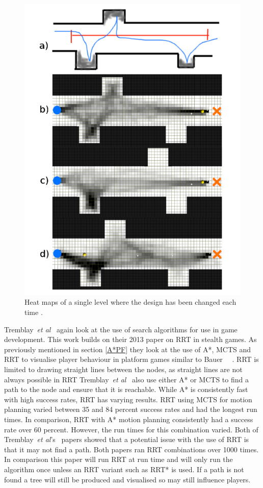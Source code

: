 \documentclass[journal]{IEEEtran}
\begin{document}
\begin{figure}[h]
	\includegraphics[width=1.0\linewidth]{TremblayHeatMap.png}
	\caption{Heat maps of a single level where the design has been changed each time \cite{Tremblay2013}.}
	\label{TremblayHeatMap}
\end{figure} 

Tremblay~\textit{et al}~\cite{Tremblay2014} again look at the use of search algorithms for use in game development. This work builds on their 2013 paper on RRT in stealth games. As previously mentioned in section \ref{A*PF} they look at the use of A*, MCTS and RRT to visualise player behaviour in platform games similar to Bauer ~\cite{Tremblay2014}~\cite{bauer2012}.  RRT is limited to drawing straight lines between the nodes, as straight lines are not always possible in RRT Tremblay~\textit{et al}~\cite{Tremblay2014} also use either A* or MCTS to find a path to the node and ensure that it is reachable.
While A* is consistently fast with high success rates, RRT has varying results. RRT using MCTS for motion planning varied between 35 and 84 percent success rates and had the longest run times. In comparison, RRT with A* motion planning consistently had a success rate over 60 percent. However, the run times for this combination varied. 
Both of Tremblay~\textit{et al}'s~\cite{Tremblay2014,Tremblay2013} papers showed that a potential issue with the use of RRT is that it may not find a path. Both papers ran RRT combinations over 1000 times. In comparison this paper will run RRT at run time and will only run the algorithm once unless an RRT variant such as RRT* is used. If a path is not found a tree will still be produced and visualised so may still influence players.
\end{document}
